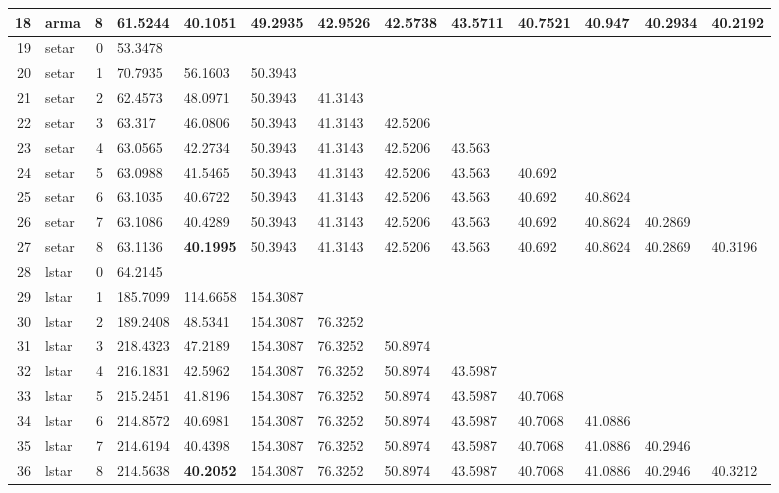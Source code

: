 \documentclass[10pt,a4paper]{article}
\begin{document}
\begin{table}[ht]
\begin{tabular}{rlrllllllllll}
  18 & arma &     8 & 61.5244 & \textbf{40.1051} & 49.2935 & 42.9526 & 42.5738 & 43.5711 & 40.7521 & 40.947 & 40.2934 & 40.2192 \\ 
   \hline
19 & setar &     0 & 53.3478 &  &  &  &  &  &  &  &  &  \\ 
  20 & setar &     1 & 70.7935 & 56.1603 & 50.3943 &  &  &  &  &  &  &  \\ 
  21 & setar &     2 & 62.4573 & 48.0971 & 50.3943 & 41.3143 &  &  &  &  &  &  \\ 
  22 & setar &     3 & 63.317 & 46.0806 & 50.3943 & 41.3143 & 42.5206 &  &  &  &  &  \\ 
  23 & setar &     4 & 63.0565 & 42.2734 & 50.3943 & 41.3143 & 42.5206 & 43.563 &  &  &  &  \\ 
  24 & setar &     5 & 63.0988 & 41.5465 & 50.3943 & 41.3143 & 42.5206 & 43.563 & 40.692 &  &  &  \\ 
  25 & setar &     6 & 63.1035 & 40.6722 & 50.3943 & 41.3143 & 42.5206 & 43.563 & 40.692 & 40.8624 &  &  \\ 
  26 & setar &     7 & 63.1086 & 40.4289 & 50.3943 & 41.3143 & 42.5206 & 43.563 & 40.692 & 40.8624 & 40.2869 &  \\ 
  27 & setar &     8 & 63.1136 & \textbf{40.1995} & 50.3943 & 41.3143 & 42.5206 & 43.563 & 40.692 & 40.8624 & 40.2869 & 40.3196 \\ 
   \hline
28 & lstar &     0 & 64.2145 &  &  &  &  &  &  &  &  &  \\ 
  29 & lstar &     1 & 185.7099 & 114.6658 & 154.3087 &  &  &  &  &  &  &  \\ 
  30 & lstar &     2 & 189.2408 & 48.5341 & 154.3087 & 76.3252 &  &  &  &  &  &  \\ 
  31 & lstar &     3 & 218.4323 & 47.2189 & 154.3087 & 76.3252 & 50.8974 &  &  &  &  &  \\ 
  32 & lstar &     4 & 216.1831 & 42.5962 & 154.3087 & 76.3252 & 50.8974 & 43.5987 &  &  &  &  \\ 
  33 & lstar &     5 & 215.2451 & 41.8196 & 154.3087 & 76.3252 & 50.8974 & 43.5987 & 40.7068 &  &  &  \\ 
  34 & lstar &     6 & 214.8572 & 40.6981 & 154.3087 & 76.3252 & 50.8974 & 43.5987 & 40.7068 & 41.0886 &  &  \\ 
  35 & lstar &     7 & 214.6194 & 40.4398 & 154.3087 & 76.3252 & 50.8974 & 43.5987 & 40.7068 & 41.0886 & 40.2946 &  \\ 
  36 & lstar &     8 & 214.5638 & \textbf{40.2052} & 154.3087 & 76.3252 & 50.8974 & 43.5987 & 40.7068 & 41.0886 & 40.2946 & 40.3212 \\ 

\end{tabular}
\end{table}
\end{document}
